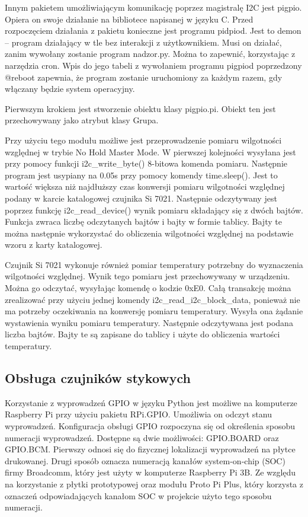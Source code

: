 \documentclass[a4paper,12pt,twoside]{article}
\begin{document}
Innym pakietem umożliwiającym komunikację poprzez magistralę I2C jest pigpio. Opiera on swoje działanie na bibliotece napisanej w języku C. Przed rozpoczęciem działania z pakietu konieczne jest programu pidpiod. Jest to demon -- program działający w tle bez interakcji z użytkownikiem. Musi on działać, zanim wywołany zostanie program nadzor.py. Można to zapewnić, korzystając z narzędzia cron. Wpis do jego tabeli z wywołaniem programu pigpiod poprzedzony @reboot zapewnia, że program zostanie uruchomiony za każdym razem, gdy włączany będzie system operacyjny.

Pierwszym krokiem jest stworzenie obiektu klasy pigpio.pi. Obiekt ten jest przechowywany jako atrybut klasy Grupa. 

Przy użyciu tego modułu możliwe jest przeprowadzenie pomiaru wilgotności względnej w trybie No Hold Master Mode. W pierwszej kolejności wysyłana jest przy pomocy funkcji i2c{\_}write{\_}byte() 8-bitowa komenda pomiaru. Następnie program jest usypiany na 0.05s przy pomocy komendy time.sleep(). Jest to wartość większa niż najdłuższy czas konwersji pomiaru wilgotności względnej podany w karcie katalogowej czujnika Si 7021. Następnie odczytywany jest poprzez funkcję i2c{\_}read{\_}device() wynik pomiaru składający się z dwóch bajtów. Funkcja zwraca liczbę odczytanych bajtów i bajty w formie tablicy. Bajty te można następnie wykorzystać do obliczenia wilgotności względnej na podstawie wzoru z karty katalogowej. 

Czujnik Si 7021 wykonuje również pomiar temperatury potrzebny do wyznaczenia wilgotności względnej. Wynik tego pomiaru jest przechowywany w urządzeniu. Można go odczytać, wysyłając komendę o kodzie 0xE0. Całą transakcję można zrealizować przy użyciu jednej komendy i2c{\_}read{\_}i2c{\_}block{\_}data, ponieważ nie ma potrzeby oczekiwania na konwersję pomiaru temperatury. Wysyła ona żądanie wystawienia wyniku pomiaru temperatury. Następnie odczytywana jest podana liczba 
bajtów. Bajty te są zapisane do tablicy i użyte do obliczenia wartości temperatury. 

\subsection{Obsługa czujników stykowych}
Korzystanie z wyprowadzeń GPIO w języku Python jest możliwe na komputerze Raspberry Pi przy użyciu pakietu RPi.GPIO. Umożliwia on odczyt stanu wyprowadzeń. Konfiguracja obsługi GPIO rozpoczyna się od określenia sposobu numeracji wyprowadzeń. Dostępne są dwie możliwości: GPIO.BOARD oraz GPIO.BCM. Pierwszy odnosi się do fizycznej lokalizacji wyprowadzeń na płytce drukowanej. Drugi sposób oznacza numeracją kanałów system-on-chip (SOC) firmy Broadcomm, który jest użyty w komputerze Raspberry Pi 3B. Ze względu na korzystanie z płytki prototypowej oraz modułu Proto Pi Plus, który korzysta z oznaczeń odpowiadających kanałom SOC w projekcie użyto tego sposobu numeracji.
\end{document}
